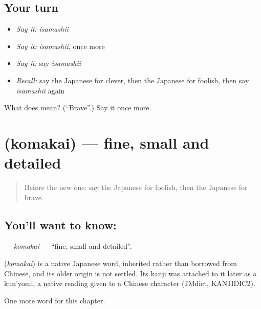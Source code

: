 \subsection*{Your turn}
\begin{itemize}
\raggedright
  \item \emph{Say it:} \emph{isamashii}
  \item \emph{Say it:} \emph{isamashii}, once more
  \item \emph{Say it:} say \emph{isamashii}
  \item \emph{Recall:} say the Japanese for clever, then the Japanese for foolish, then say \emph{isamashii} again
\end{itemize}

\begin{tcolorbox}[breakable,colback=teal!4,colframe=teal!35!black,title={Before you move on}]
What does  mean? (\textquotedblleft{}Brave\textquotedblright{}.) Say it once more.
\end{tcolorbox}
\section[\texorpdfstring{\ja{こまかい} (komakai)}{こまかい (komakai)}]{ (komakai) — fine, small and detailed}

\label{lesson:JA-C128-komakai}



\begin{quote}
Before the new one: say the Japanese for foolish, then the Japanese for brave.
\end{quote}

\subsection*{You'll want to know: }
\textbf{} — \emph{komakai} — \textquotedblleft{}fine, small and detailed\textquotedblright{}.

\begin{cousinweb}
\textbf{} (\emph{komakai}) is a native Japanese word, inherited rather than borrowed from Chinese, and its older origin is not settled. Its kanji was attached to it later as a kun'yomi, a native reading given to a Chinese character (JMdict, KANJIDIC2).
\end{cousinweb}

\begin{grammarlens}[title={What you've built}]
One more word for this chapter.
\end{grammarlens}

